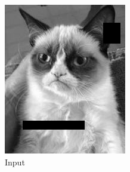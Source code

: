 \documentclass{paper}
\begin{document}
\begin{figure}[H]
\centering
\begin{subfigure}[ht]{0.45\textwidth}
	\centering
	\includegraphics[width=\textwidth]{input-cat}
	\caption*{Input}
\end{subfigure}
~
\begin{subfigure}[ht]{0.45\textwidth}
	\centering

\end{subfigure}
\end{figure}
\end{document}

